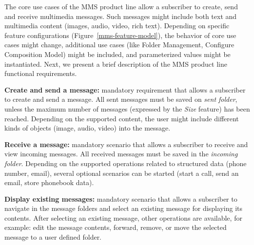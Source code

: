 \documentclass{acm_proc_article-sp}
\begin{document}
The core use cases of the MMS product line allow a subscriber to create, send and receive multimedia messages. Such messages might include both text and multimedia content (images, audio, video, rich text). Depending on specific feature configurations (Figure~\ref{mms-feature-model}), the behavior of core use cases might change, additional use cases (like Folder Management, Configure Composition Model) might be included, and parameterized values might be instantiated. Next, we present a brief description of the MMS product line functional requirements.

{\bf Create and send a message:} mandatory requirement that allows a subscriber to create and send a message. All sent messages must be saved on \emph{sent folder}, unless the maximum number of messages (expressed by the \emph{Size} feature) has been reached. Depending on the supported content, the user might include different kinds of objects (image, audio, video) into the message. 


{\bf Receive a message:} mandatory scenario that allows a subscriber to receive and view incoming messages. All received messages must be saved in the \emph{incoming folder}. Depending on the supported operations related to structured data (phone number, email), several optional scenarios can be started (start a call, send an email, store phonebook data).

{\bf Display existing messages:} mandatory scenario that allows a subscriber to navigate in the message folders and select an existing message for displaying its contents. After selecting an existing message, other operations are available, for example: edit the message contents, forward, remove, or move the selected message to a user defined folder. 

\end{document}
